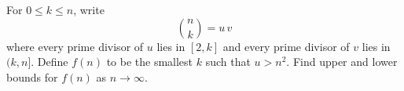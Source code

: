 For $0\le k\le n$, write
\[\binom{n}{k}=u\,v\]
where every prime divisor of $u$ lies in $[2,k]$ and every prime divisor of $v$ lies in $(k,n]$.
Define $f(n)$ to be the smallest $k$ such that $u>n^{2}$.
Find upper and lower bounds for $f(n)$ as $n\to\infty$.
